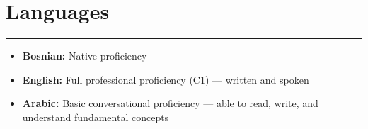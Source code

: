 \section*{Languages}
\vspace{-5pt}
\noindent\rule{\textwidth}{0.4pt}

\begin{itemize}[leftmargin=*,noitemsep,topsep=3pt]
    \item \textbf{Bosnian:} Native proficiency
    \item \textbf{English:} Full professional proficiency (C1) — written and spoken
    \item \textbf{Arabic:} Basic conversational proficiency — able to read, write, and understand fundamental concepts
\end{itemize}